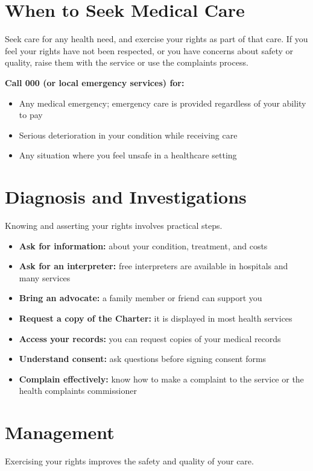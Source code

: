 \section*{When to Seek Medical Care}
Seek care for any health need, and exercise your rights as part of that care. If you feel your rights have not been respected, or you have concerns about safety or quality, raise them with the service or use the complaints process.

\textbf{Call 000 (or local emergency services) for:}
\begin{itemize}
    \item Any medical emergency; emergency care is provided regardless of your ability to pay
    \item Serious deterioration in your condition while receiving care
    \item Any situation where you feel unsafe in a healthcare setting
\end{itemize}

\section*{Diagnosis and Investigations}
Knowing and asserting your rights involves practical steps.

\begin{itemize}
    \item \textbf{Ask for information:} about your condition, treatment, and costs
    \item \textbf{Ask for an interpreter:} free interpreters are available in hospitals and many services
    \item \textbf{Bring an advocate:} a family member or friend can support you
    \item \textbf{Request a copy of the Charter:} it is displayed in most health services
    \item \textbf{Access your records:} you can request copies of your medical records
    \item \textbf{Understand consent:} ask questions before signing consent forms
    \item \textbf{Complain effectively:} know how to make a complaint to the service or the health complaints commissioner
\end{itemize}

\section*{Management}
Exercising your rights improves the safety and quality of your care.


